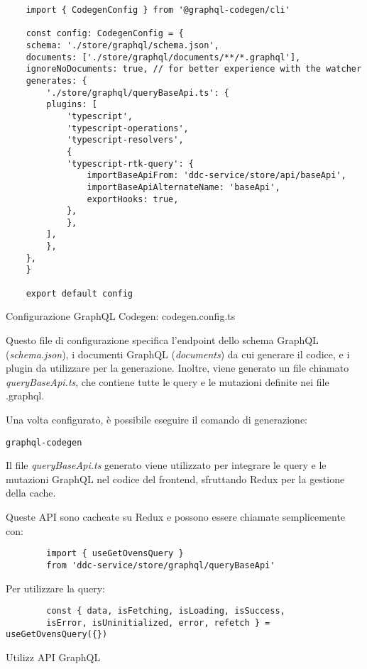 \begin{listing}[H]
    \begin{verbatim}
    import { CodegenConfig } from '@graphql-codegen/cli'

    const config: CodegenConfig = {
    schema: './store/graphql/schema.json',
    documents: ['./store/graphql/documents/**/*.graphql'],
    ignoreNoDocuments: true, // for better experience with the watcher
    generates: {
        './store/graphql/queryBaseApi.ts': {
        plugins: [
            'typescript',
            'typescript-operations',
            'typescript-resolvers',
            {
            'typescript-rtk-query': {
                importBaseApiFrom: 'ddc-service/store/api/baseApi',
                importBaseApiAlternateName: 'baseApi',
                exportHooks: true,
            },
            },
        ],
        },
    },
    }

    export default config
    \end{verbatim}
    \caption{Configurazione GraphQL Codegen: codegen.config.ts}
    \label{listing_confgraphql_codegen}
\end{listing}

Questo file di configurazione specifica l'endpoint dello schema GraphQL (\textit{schema.json}), 
i documenti GraphQL (\textit{documents}) da cui generare il codice, e i plugin da utilizzare per la generazione.
Inoltre, viene generato un file chiamato \textit{queryBaseApi.ts}, che contiene tutte le query e le mutazioni definite nei file .graphql.

Una volta configurato, è possibile eseguire il comando di generazione:

\begin{verbatim}
graphql-codegen
\end{verbatim}

Il file \textit{queryBaseApi.ts} generato viene utilizzato per integrare le query e le mutazioni GraphQL nel codice del frontend, sfruttando Redux per la gestione della cache.

Queste API sono cacheate su Redux e possono essere chiamate semplicemente con:

\begin{listing}[H]
    \begin{verbatim}
        import { useGetOvensQuery } 
        from 'ddc-service/store/graphql/queryBaseApi'
    \end{verbatim}
    Per utilizzare la query:
    \begin{verbatim}
        const { data, isFetching, isLoading, isSuccess, 
        isError, isUninitialized, error, refetch } = useGetOvensQuery({})
    \end{verbatim}
    \caption{Utilizz API GraphQL}
    \label{listing_utilizzo_api}
\end{listing}

